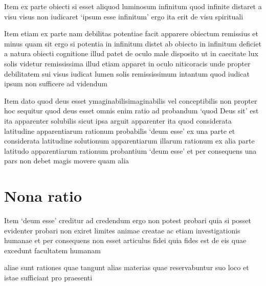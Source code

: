 \documentclass[twoside, openright]{report}
\begin{document}
        \pstart
        Item ex parte obiecti si esset aliquod luminosum infinitum quod infinite distaret a visu visus non iudicaret \enquote*{ipsum esse infinitum} ergo ita erit de visu spirituali
        \pend
     
        \pstart
        Item etiam ex parte nam debilitas potentiae facit apparere obiectum remissius et minus quam sit ergo si potentia in infinitum distet ab obiecto in infinitum deficiet a natura obiecti cognitione illud patet de oculo male disposito ut in caecitate lux solis videtur remississima illud etiam apparet in oculo niticoracis unde propter debilitatem sui visus iudicat lumen solis remississimum intantum quod iudicat ipsum non sufficere ad videndum
        \pend
     
        \pstart
        Item dato quod deus esset ymaginabilisimaginabilis vel conceptibilis non propter hoc sequitur quod deus esset omnis enim ratio ad probandum \enquote*{quod Deus sit} est ita apparenter solubilis sicut ipsa arguit apparenter ita quod considerata latitudine apparentiarum rationum probabilis \enquote*{deum esse} ex una parte et considerata latitudine solutionum apparentiarum illarum rationum ex alia parte latitudo apparentiarum rationum probantium  \enquote*{deum esse} et per consequens una pars non debet magis movere quam alia
        \pend
      
        \bigskip
         \section*{Nona ratio} 
        \pstart
        Item \enquote*{deum esse} creditur ad credendum ergo non potest probari quia si posset evidenter probari non exiret limites animae creatae ac etiam investigationis humanae et per consequens non esset articulus fidei quia fides est de eis quae excedunt facultatem humanam
        \pend
      
        \bigskip
         
        \pstart
        aliae sunt rationes quae tangunt alias materias quae reservabuntur suo loco et istae sufficiant pro praesenti
        \pend
       
        \bigskip
\end{document}
